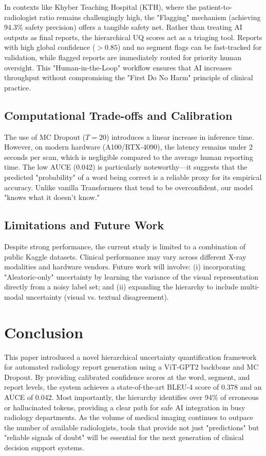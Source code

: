 \documentclass{jcst}
\begin{document}
In contexts like Khyber Teaching Hospital (KTH), where the patient-to-radiologist ratio remains
challengingly high, the "Flagging" mechanism (achieving 94.3\% safety precision) offers a
tangible safety net. Rather than treating AI outputs as final reports, the hierarchical UQ
scores act as a triaging tool. Reports with high global confidence ($>0.85$) and no segment
flags can be fast-tracked for validation, while flagged reports are immediately routed for
priority human oversight. This "Human-in-the-Loop" workflow ensures that AI increases throughput
without compromising the "First Do No Harm" principle of clinical practice.

\subsection{Computational Trade-offs and Calibration}

The use of MC Dropout ($T=20$) introduces a linear increase in inference time. However, on
modern hardware (A100/RTX-4090), the latency remains under 2 seconds per scan, which is
negligible compared to the average human reporting time. The low AUCE (0.042) is particularly
noteworthy—it suggests that the predicted "probability" of a word being correct is a reliable
proxy for its empirical accuracy. Unlike vanilla Transformers that tend to be overconfident, our
model "knows what it doesn't know."

\subsection{Limitations and Future Work}

Despite strong performance, the current study is limited to a combination of public Kaggle
datasets. Clinical performance may vary across different X-ray modalities and hardware vendors.
Future work will involve: (i) incorporating "Aleatoric-only" uncertainty by learning the
variance of the visual representation directly from a noisy label set; and (ii) expanding the
hierarchy to include multi-modal uncertainty (visual vs. textual disagreement).

\section{Conclusion}

This paper introduced a novel hierarchical uncertainty quantification framework for automated
radiology report generation using a ViT-GPT2 backbone and MC Dropout. By providing calibrated
confidence scores at the word, segment, and report levels, the system achieves a state-of-the-art
BLEU-4 score of 0.378 and an AUCE of 0.042. Most importantly, the hierarchy identifies over 94\%
of erroneous or hallucinated tokens, providing a clear path for safe AI integration in busy
radiology departments. As the volume of medical imaging continues to outpace the number of
available radiologists, tools that provide not just "predictions" but "reliable signals of
doubt" will be essential for the next generation of clinical decision support systems.
\end{document}
